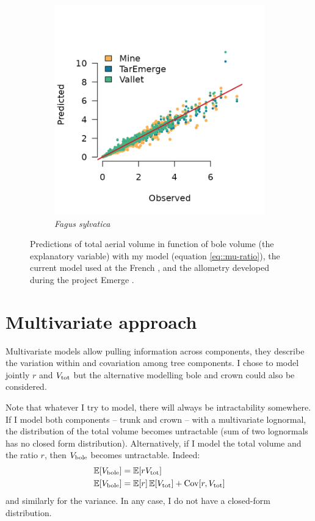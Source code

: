 \begin{figure}[htb]
\begin{subfigure}{0.4\textwidth}
		\includegraphics{./Figures/fagSyl-pred.png}
		\caption{\textit{Fagus sylvatica}}
	\end{subfigure}
	\caption{Predictions of total aerial volume in function of bole volume (the explanatory variable) with my model (equation \eqref{eq::mu-ratio}), the current model used at the French \NFI \parencite{Vallet2006}, and the allometry developed during the project Emerge \parencite{Deleuze2014}.}
	\label{fig::pred-ratio}
\end{figure}

\section{Multivariate approach}

Multivariate models allow pulling information across components, \ie they describe the variation within and covariation among tree components. I chose to model jointly \( r \) and \( V_{\text{tot}} \) but the alternative modelling bole and crown could also be considered.

\begin{tcolorbox}[breakable, title = Intractability]
Note that whatever I try to model, there will always be intractability somewhere. If I model both components -- trunk and crown -- with a multivariate lognormal, the distribution of the total volume becomes untractable (sum of two lognormals has no closed form distribution). Alternatively, if I model the total volume and the ratio \( r \), then \( V_{\text{bole}} \) becomes untractable. Indeed:
\begin{align*}
	\operatorname{\mathbb{E}}[V_{\text{bole}}] &= \operatorname{\mathbb{E}}[r V_{\text{tot}}] \\
	\operatorname{\mathbb{E}}[V_{\text{bole}}] &= \operatorname{\mathbb{E}}[r] \operatorname{\mathbb{E}}[V_{\text{tot}}] + \operatorname{Cov}[r, V_{\text{tot}}]
\end{align*}
and similarly for the variance. In any case, I do not have a closed-form distribution.
\end{tcolorbox}

